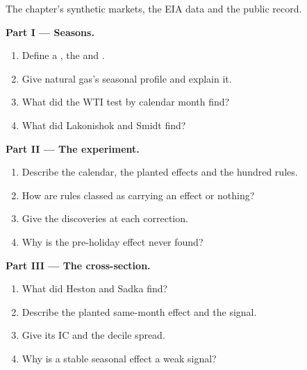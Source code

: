 \begin{problem}\label{pb:s1:seasonality-and-calendar-effects:1}
The chapter's synthetic markets, the EIA data and the public record.

\medskip\noindent\textbf{Part I --- Seasons.}
\begin{enumerate}
\item Define a , the  and .
\item Give natural gas's seasonal profile and explain it.
\item What did the WTI test by calendar month find?
\item What did Lakonishok and Smidt find?
\end{enumerate}

\medskip\noindent\textbf{Part II --- The experiment.}
\begin{enumerate}[resume]
\item Describe the calendar, the planted effects and the hundred rules.
\item How are rules classed as carrying an effect or nothing?
\item Give the discoveries at each correction.
\item Why is the pre-holiday effect never found?
\end{enumerate}

\medskip\noindent\textbf{Part III --- The cross-section.}
\begin{enumerate}[resume]
\item What did Heston and Sadka find?
\item Describe the planted same-month effect and the signal.
\item Give its IC and the decile spread.
\item Why is a stable seasonal effect a weak signal?
\end{enumerate}


\end{problem}
